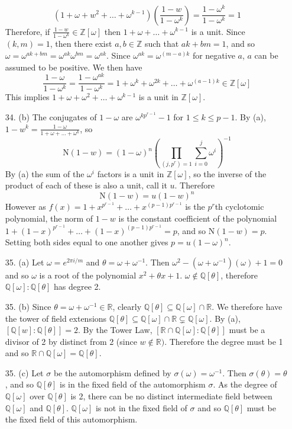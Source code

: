 \documentclass{article}
\newcommand{\w}[0]{\omega}
\newcommand{\Q}[0]{\mathbb{Q}}
\newcommand{\R}[0]{\mathbb{R}}
\newcommand{\Z}[0]{\mathbb{Z}}
\newcommand{\norm}[0]{\text{N}}
\begin{document}
\begin{enumerate}
\[ (1 + \w + w^2 + \ldots + \w^{k-1}) \left(\frac{1 - w}{1 - \w^k}\right) = \frac{1 - \w^k}{1 - \w^k} = 1 \]
Therefore, if $\frac{1 - w}{1 - \w^k} \in \Z[\w]$ then $1 + \w + \ldots + \w^{k-1}$ is a unit.  Since $(k, m) = 1$, then there exist $a, b \in \Z$ such that $ak + bm = 1$, and so $\w = \w^{ak + bm} = \w^{ak} \w^{bm} = \w^{ak}$.  Since $\w^{ak} = \w^{(m - a)k}$ for negative $a$, $a$ can be assumed to be positive.  We then have \[ \frac{1 - \w}{1 - \w^k} = \frac{1 - \w^{ak}}{1 - \w^{k}} = 1 + \w^{k} + \w^{2k} + \ldots + \w^{(a - 1)k} \in \Z[\w] \]
This implies $1 + \w + \w^2 + \ldots + \w^{k-1}$ is a unit in $\Z[\w]$.

\item[34. (b)] The conjugates of $1 - \w$ are $\w^{kp^{r-1}} - 1$ for $1 \le k \le p - 1$.  By (a), $1 - w^{k} = \frac{1 - \w}{1 + \w + \ldots + \w^{k}}$, so \[ \norm(1 - w) = (1 - \w)^{n}\left(\prod_{(j, p^r) = 1} \sum_{i = 0}^{j} \w^{i}\right)^{-1} \]
By (a) the sum of the $\w^{i}$ factors is a unit in $\Z[\w]$, so the inverse of the product of each of these is also a unit, call it $u$.  Therefore \[ \norm(1-w) = u(1 - w)^n\]  However as $f(x) = 1 + x^{p^{r-1}} + \ldots + x^{(p-1)p^{r-1}}$ is the $p^r$th cyclotomic polynomial, the norm of $1 - w$ is the constant coefficient of the polynomial $1 + (1 - x)^{p^{r-1}} + \ldots + (1 - x)^{(p - 1)p^{r-1}} = p$, and so $\norm(1 - w) = p$.  Setting both sides equal to one another gives $p = u(1 - \w)^n$.

\item[35. (a)]  Let $\w = e^{2\pi i /m}$ and $\theta = \w + \w^{-1}$.  Then $\w^2 - (\w + \w^{-1})(\w) + 1 = 0$ and so $\w$ is a root of the polynomial $x^2 + \theta x + 1$.  $\w \not\in \Q[\theta]$, therefore $\Q[\w] : \Q[\theta]$ has degree 2.

\item[35. (b)]  Since $\theta = \w + \w^{-1} \in \R$, clearly $\Q[\theta]  \subseteq \Q[\w] \cap \R$.  We therefore have the tower of field extensions $\Q[\theta] \subseteq \Q[\w] \cap \R \subsetneq \Q[\w]$.  By (a), $[\Q[w] : \Q[\theta]] = 2$.  By the Tower Law, $[\R \cap \Q[\w] : \Q[\theta]]$ must be a divisor of 2 by distinct from 2 (since $w \not\in \R)$.  Therefore the degree must be 1 and so $\R \cap \Q[\w] = \Q[\theta]$.

\item[35. (c)]  Let $\sigma$ be the automorphism defined by $\sigma(\w) = \w^{-1}$.  Then $\sigma(\theta) = \theta$, and so $\Q[\theta]$ is in the fixed field of the automorphism $\sigma$.  As the degree of $\Q[\w]$ over $\Q[\theta]$ is 2, there can be no distinct intermediate field between $\Q[\w]$ and $\Q[\theta]$.  $\Q[\w]$ is not in the fixed field of $\sigma$ and so $\Q[\theta]$ must be the fixed field of this automorphism.


\end{enumerate}
\end{document}
